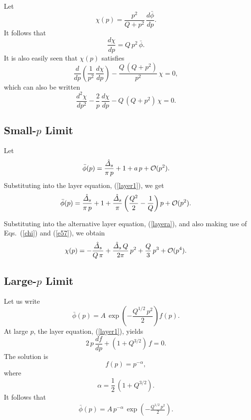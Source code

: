 \documentclass[titlepage=false,12pt]{article}
\begin{document}
Let
\begin{equation}
\chi(p) = \frac{p^2}{Q+p^2}\,\frac{d\bar{\phi}}{dp}.
\end{equation}
It follows that
\begin{equation}\label{chi}
\frac{d\chi}{dp}=Q\,p^2\,\bar{\phi}.
\end{equation}
It is also easily seen that $\chi(p)$ satisfies
\begin{equation}
\frac{d}{dp}\left(\frac{1}{p^2}\,\frac{d\chi}{dp}\right)-\frac{Q\,(Q+p^2)}{p^2}\,\chi=0,
\end{equation}
which can also be written
\begin{equation}\label{layera}
\frac{d^2\chi}{dp^2}-\frac{2}{p}\,\frac{d\chi}{dp} - Q\,(Q+p^2)\,\chi = 0.
\end{equation}

\subsection{Small-$p$ Limit}
Let
\begin{equation}
\bar{\phi}(p)= \frac{\hat{\mit\Delta}_s}{\pi\,p} + 1 + a\,p+{\cal O}(p^2).
\end{equation}
Substituting into the layer equation, (\ref{layer1}), we get
\begin{equation}\label{e57}
\bar{\phi}(p) =  \frac{\hat{\mit\Delta}_s}{\pi\,p} + 1 + \frac{\hat{\mit\Delta}_s}{\pi}\left(\frac{Q^2}{2}-\frac{1}{Q}\right)p + {\cal O}(p^2).
\end{equation}

Substituting into the alternative layer equation, (\ref{layera}), and also making use of Eqs.~(\ref{chi}) and (\ref{e57}), we obtain
\begin{equation}\label{chis}
\chi(p) = -\frac{\hat{{\mit\Delta}}_s}{Q\,\pi} + \frac{\hat{{\mit\Delta}}_s\,Q}{2\pi}\,p^2+\frac{Q}{3}\,p^3+{\cal O}(p^4).
\end{equation}

\subsection{Large-$p$ Limit}
Let us write
\begin{equation}
\bar{\phi}(p) = A\,\exp\left(-\frac{Q^{1/2}\,p^2}{2}\right)f(p).
\end{equation}
At large $p$, the layer equation, (\ref{layer1}), yields
\begin{equation}
2\,p\,\frac{df}{dp} +(1+Q^{3/2})\,f = 0.
\end{equation}
The solution is 
\begin{equation}
f(p) = p^{-\alpha},
\end{equation}
where
\begin{equation}
\alpha = \frac{1}{2}\,(1+Q^{3/2}).
\end{equation}
It follows that
\begin{align}\label{lphi}
\bar{\phi}(p)= A\,p^{-\alpha}\,\exp\left(-\frac{Q^{1/2}\,p^2}{2}\right).
\end{align}
\end{document}
